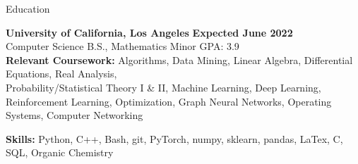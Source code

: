 \documentclass{resume}
\begin{document}
\begin{rSection}{Education}

{\bf University of California, Los Angeles} \hfill {\bf Expected June 2022} 
\\ Computer Science B.S., Mathematics Minor \hfill {GPA: 3.9}\\
{\bf Relevant Coursework:} Algorithms, Data Mining, Linear Algebra, Differential Equations, Real Analysis,\\ Probability/Statistical Theory I \& II, 
Machine Learning, Deep Learning, Reinforcement Learning, Optimization, Graph Neural Networks, Operating Systems, Computer Networking
\end{rSection}

{\bf Skills:} Python, C++, Bash, git, PyTorch, numpy, sklearn, pandas, LaTex, C, SQL, Organic Chemistry
\end{document}
